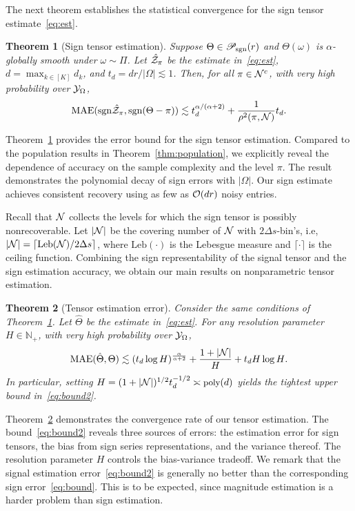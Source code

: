 \documentclass{article}
\theoremstyle{plain}
\newtheorem{thm}{Theorem}
\theoremstyle{definition}
\def\sign{\textup{sgn}}
\def\caliP{\mathscr{P}_{\textup{sgn}}}
\begin{document}
The next theorem establishes the statistical convergence for the sign tensor estimate~\eqref{eq:est}.

\begin{thm}[Sign tensor estimation]\label{thm:classification} Suppose $\Theta\in\caliP(r)$ and $\Theta(\omega)$ is $\alpha$-globally smooth under $\omega\sim \Pi$. Let $\hat {\mathcal{Z}}_\pi$ be the estimate in~\eqref{eq:est}, $d=\max_{k\in[K]}d_k$, and $t_d =dr/|\Omega|\lesssim 1$. Then, for all $\pi\in\mathcal{N}^c$, with very high probability over $\mathcal{Y}_\Omega$, 
\begin{align}\label{eq:bound}
\textup{MAE}(\sign \hat \tZ_\pi, \sign(\Theta-\pi)) \lesssim t_d^{\alpha/( \alpha+2)}+{1 \over \rho^2(\pi, \tN)}t_d.
\end{align}
\end{thm}
Theorem~\ref{thm:classification} provides the error bound for the sign tensor estimation. Compared to the population results in Theorem~\ref{thm:population}, we explicitly reveal the dependence of accuracy on the sample complexity and the level $\pi$. The result demonstrates the polynomial decay of sign errors with $|\Omega|$.  Our sign estimate achieves consistent recovery using as few as $\mathcal{O}(dr)$ noisy entries. 

Recall that $\mathcal{N}$ collects the levels for which the sign tensor is possibly nonrecoverable. Let $|\mathcal{N}|$ be the covering number of $\mathcal{N}$ with $2\Delta s$-bin's, i.e, $|\mathcal{N}| = \lceil \text{Leb}(\mathcal{N})/2\Delta s \rceil$, where $\text{Leb}(\cdot)$ is the Lebesgue measure and $\lceil \cdot \rceil$ is the ceiling function. Combining the sign representability of the signal tensor and the sign estimation accuracy, we obtain our main results on nonparametric tensor estimation. 


\begin{thm}[Tensor estimation error]\label{thm:estimation} Consider the same conditions of Theorem~\ref{thm:classification}. Let $\hat \Theta$ be the estimate in~\eqref{eq:est}. For any resolution parameter $H\in\mathbb{N}_{+}$, with very high probability over $\mathcal{Y}_\Omega$,
\begin{equation}\label{eq:bound2}
\textup{MAE}(\hat \Theta, \Theta)\lesssim (t_d\log H)^{\alpha\over \alpha+2}+{1+|\mathcal{N}|\over H}+{t_dH\log H}.
\end{equation}
In particular, setting $\footnotesize H= (1+|\tN|)^{1/2} t_d^{-1/2}\asymp \text{poly}(d)$ yields the tightest upper bound in~\eqref{eq:bound2}.
\end{thm}

Theorem~\ref{thm:estimation} demonstrates the convergence rate of our tensor estimation. The bound~\eqref{eq:bound2} reveals three sources of errors: the estimation error for sign tensors, the bias from sign series representations, and the variance thereof. The resolution parameter $H$ controls the bias-variance tradeoff. We remark that the signal estimation error~\eqref{eq:bound2} is generally no better than the corresponding sign error~\eqref{eq:bound}. This is to be expected, since magnitude estimation is  a harder problem than sign estimation. 
\end{document}
